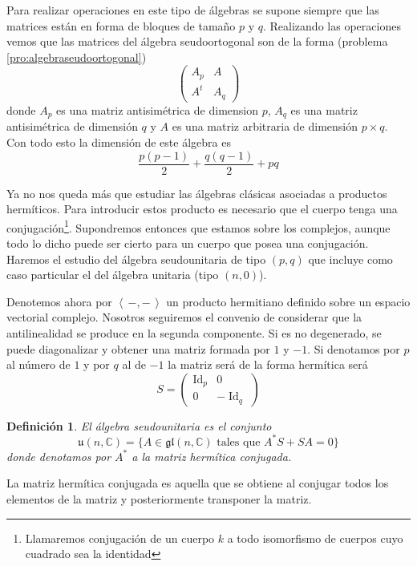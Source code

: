 \documentclass[a4paper,draft,12pt]{scrartcl}
\newtheorem{defi}{Definición}[section]%
\newcommand{\C}{\mathbb{C}}%
\newcommand{\escalar}[2]{\left\langle\, #1,#2\, \right\rangle}  %
\newcommand{\df}[1]{\textsf{\color{blue}#1}}
\DeclareMathOperator{\Id}{Id}%
\begin{document}
Para realizar operaciones en este tipo de álgebras se supone siempre que las matrices están en forma de bloques de tamaño $p$ y $q$.  Realizando las operaciones vemos que las matrices del álgebra seudoortogonal son de la forma (problema \ref{pro:algebraseudoortogonal})
$$
\begin{pmatrix}
A_p & A \\
{A}^t& A_q
\end{pmatrix}
$$
donde $A_p$ es una matriz antisimétrica de dimension $p$, $A_q$ es una matriz antisimétrica de dimensión $q$ y $A$ es una matriz arbitraria de dimensión $p\times q$.  Con todo esto la dimensión de este álgebra es 
$$
\frac{p(p-1)}{2}+\frac{q(q-1)}{2}+ pq
$$

\bigskip


Ya no nos queda más que estudiar las álgebras clásicas asociadas a productos hermíticos. Para introducir estos producto es necesario que el cuerpo tenga una conjugación\footnote{Llamaremos  \df{conjugación}  de un cuerpo $k$ a todo isomorfismo de cuerpos cuyo cuadrado sea la identidad}.  Supondremos entonces que estamos sobre los complejos, aunque todo lo dicho puede ser cierto para un cuerpo que posea una conjugación. Haremos el estudio del álgebra seudounitaria de tipo $(p,q)$ que incluye como caso particular el del álgebra unitaria (tipo $(n,0)$).

Denotemos ahora por $\escalar{-}{-}$ un producto hermitiano definido sobre un espacio vectorial complejo. Nosotros seguiremos el convenio de considerar que la antilinealidad se produce en la segunda componente. Si es no degenerado, se puede diagonalizar y obtener una matriz formada por $1$ y $-1$.  Si denotamos por $p$ al número de $1$ y por $q$ al de $-1$ la matriz será de la forma hermítica será
$$
S= \begin{pmatrix}
\Id_p & 0 \\
0 & -\Id_q
\end{pmatrix}
$$



\begin{defi}

El  \df{álgebra seudounitaria}  es el conjunto
$$
\mathfrak{u}(n,\C)= \{ A \in \mathfrak{gl}(n,\C)\text{ tales que } A^*S+SA=0 \}
$$
donde denotamos por $A^*$ a la matriz hermítica conjugada.

\end{defi}

La matriz hermítica conjugada es aquella que se obtiene al conjugar todos los elementos de la matriz y posteriormente transponer la matriz.
\end{document}
